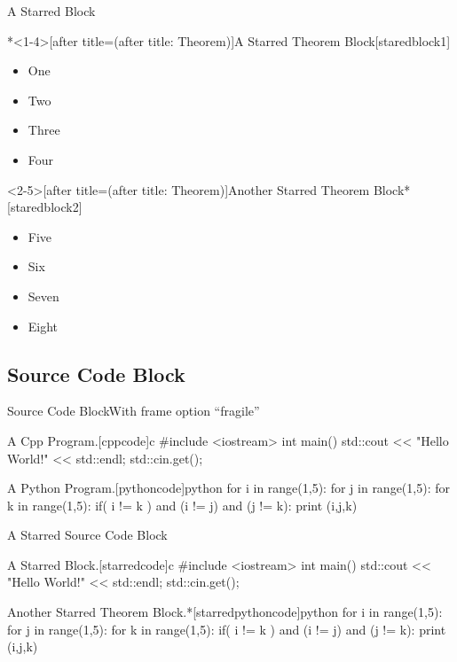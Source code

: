 \documentclass[hyperref, UTF8, CJK, aspectratio=169]{beamer}
\begin{document}
\begin{frame}{A Starred Block}
\begin{bittheorem}*<1-4>[after title=(after title: Theorem)]{A Starred Theorem Block}[staredblock1]
	\begin{itemize}[<+->]
		\item One
		\item Two~\only<2>{Two}
		\item \alert<3>{Three}
		\item Four
	\end{itemize}
\end{bittheorem}
\begin{bittheorem}<2-5>[after title=(after title: Theorem)]{Another Starred Theorem Block}*[staredblock2]
	\begin{itemize}
		\item Five
		\item Six~\only<3>{Six}
		\item \alert<3>{Seven}
		\item Eight
	\end{itemize}
\end{bittheorem}
\end{frame}

\subsection{Source Code Block}
\begin{frame}[fragile]{Source Code Block}{With frame option ``fragile''}
	\onslide<2>
	\begin{bitcode}{A Cpp Program.}[cppcode]{c}
		#include <iostream>
		int main()
		{
			std::cout << "Hello World!" << std::endl;
			std::cin.get();
		}
	\end{bitcode}
	\begin{bitcode}{A Python Program.}[pythoncode]{python}
		for i in range(1,5):
			for j in range(1,5):
				for k in range(1,5):
					if( i != k ) and (i != j) and (j != k):
						print (i,j,k)
	\end{bitcode}
\end{frame}

\begin{frame}[fragile]{A Starred Source Code Block}
	\begin{bitcode*}{A Starred Block.}[starredcode]{c}
		#include <iostream>
		int main()
		{
			std::cout << "Hello World!" << std::endl;
			std::cin.get();
		}
	\end{bitcode*}
	\begin{bitcode}{Another Starred Theorem Block.}*[starredpythoncode]{python}
		for i in range(1,5):
			for j in range(1,5):
				for k in range(1,5):
					if( i != k ) and (i != j) and (j != k):
						print (i,j,k)
	\end{bitcode}
\end{frame}
\end{document}
